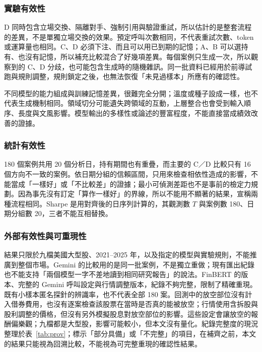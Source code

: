 \subsubsection{實驗有效性}
D 同時包含立場交換、隔離對手、強制引用與驗證重試，所以估計的是整套流程的差異，不是單獨立場交換的效果。預定呼叫次數相同，不代表重試次數、token 或運算量也相同。C、D 必須下注、而且可以用已到期的記憶；A、B 可以選持有、也沒有記憶，所以補充比較混合了好幾項差異。每個案例只生成一次，所以觀察到的 C、D 分歧，也可能包含生成時的隨機雜訊。同一批資料已經用於前導試跑與規則調整，規則鎖定之後，也無法恢復「未見過樣本」所應有的確認性。

不同模型的能力組成與訓練記憶差異，很難完全分開；溫度或種子設成一樣，也不代表生成機制相同。領域切分可能遺失跨領域的互動，上層整合也會受到輸入順序、長度與文風影響。模型輸出的多樣性或論述的豐富程度，不能直接當成績效改善的證據。

\subsubsection{統計有效性}
180 個案例共用 20 個分析日，持有期間也有重疊，而主要的 C／D 比較只有 16 個方向不一致的案例。依日期分組的信賴區間，只用來檢查相依性造成的影響，不能當成「一樣好」或「不比較差」的證據；最小可偵測差距也不是事前的檢定力規劃。因為事先沒有訂定「算作一樣好」的界線，所以不能用不顯著的結果，宣稱兩種流程相同。Sharpe 是用對齊後的日序列計算的，其觀測數 $T$ 與案例數 180、日期分組數 20，三者不能互相替換。

\subsubsection{外部有效性與可重現性}
結果只限於九檔美國大型股、2021--2025 年，以及指定的模型與實驗規則，不能推廣到整個市場。Gemini 的比較用的是同一批案例，不是獨立重做；現有匯出紀錄也不能支持「兩個模型一字不差地讀到相同研究報告」的說法。FinBERT 的版本、完整的 Gemini 呼叫設定與行情調整版本，紀錄不夠完整，限制了精確重現。既有小樣本匿名探針的辨識率，也不代表全部 180 案。回測中的放空部位沒有計入借券費用，也沒有逐案檢查該股票在當時是否真的能被放空；行情使用含拆股與股利調整的價格，但沒有另外模擬股息對放空部位的影響。這些設定會讓放空的報酬偏樂觀；九檔都是大型股，影響可能較小，但本文沒有量化。紀錄完整度的現況整理於表~\ref{tab:prov}；標示「部分具備」或「不完整」的項目，在補齊之前，本文的結果只能視為回溯比較，不能視為可完整重現的確認性結果。

